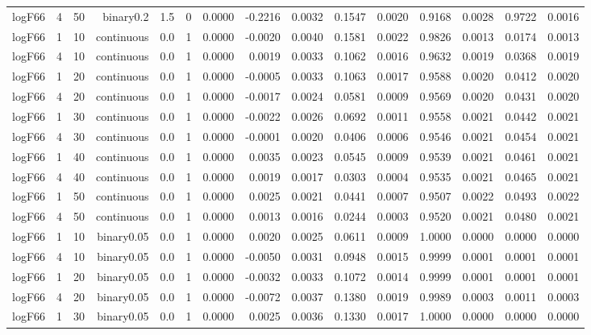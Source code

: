 \begin{longtable}{rrrrrrrrrrrrrrr}
  logF66 & 4 & 50 & binary0.2 & 1.5 & 0 & 0.0000 & -0.2216 & 0.0032 & 0.1547 & 0.0020 & 0.9168 & 0.0028 & 0.9722 & 0.0016 \\ 
  logF66 & 1 & 10 & continuous & 0.0 & 1 & 0.0000 & -0.0020 & 0.0040 & 0.1581 & 0.0022 & 0.9826 & 0.0013 & 0.0174 & 0.0013 \\ 
  logF66 & 4 & 10 & continuous & 0.0 & 1 & 0.0000 & 0.0019 & 0.0033 & 0.1062 & 0.0016 & 0.9632 & 0.0019 & 0.0368 & 0.0019 \\ 
  logF66 & 1 & 20 & continuous & 0.0 & 1 & 0.0000 & -0.0005 & 0.0033 & 0.1063 & 0.0017 & 0.9588 & 0.0020 & 0.0412 & 0.0020 \\ 
  logF66 & 4 & 20 & continuous & 0.0 & 1 & 0.0000 & -0.0017 & 0.0024 & 0.0581 & 0.0009 & 0.9569 & 0.0020 & 0.0431 & 0.0020 \\ 
  logF66 & 1 & 30 & continuous & 0.0 & 1 & 0.0000 & -0.0022 & 0.0026 & 0.0692 & 0.0011 & 0.9558 & 0.0021 & 0.0442 & 0.0021 \\ 
  logF66 & 4 & 30 & continuous & 0.0 & 1 & 0.0000 & -0.0001 & 0.0020 & 0.0406 & 0.0006 & 0.9546 & 0.0021 & 0.0454 & 0.0021 \\ 
  logF66 & 1 & 40 & continuous & 0.0 & 1 & 0.0000 & 0.0035 & 0.0023 & 0.0545 & 0.0009 & 0.9539 & 0.0021 & 0.0461 & 0.0021 \\ 
  logF66 & 4 & 40 & continuous & 0.0 & 1 & 0.0000 & 0.0019 & 0.0017 & 0.0303 & 0.0004 & 0.9535 & 0.0021 & 0.0465 & 0.0021 \\ 
  logF66 & 1 & 50 & continuous & 0.0 & 1 & 0.0000 & 0.0025 & 0.0021 & 0.0441 & 0.0007 & 0.9507 & 0.0022 & 0.0493 & 0.0022 \\ 
  logF66 & 4 & 50 & continuous & 0.0 & 1 & 0.0000 & 0.0013 & 0.0016 & 0.0244 & 0.0003 & 0.9520 & 0.0021 & 0.0480 & 0.0021 \\ 
  logF66 & 1 & 10 & binary0.05 & 0.0 & 1 & 0.0000 & 0.0020 & 0.0025 & 0.0611 & 0.0009 & 1.0000 & 0.0000 & 0.0000 & 0.0000 \\ 
  logF66 & 4 & 10 & binary0.05 & 0.0 & 1 & 0.0000 & -0.0050 & 0.0031 & 0.0948 & 0.0015 & 0.9999 & 0.0001 & 0.0001 & 0.0001 \\ 
  logF66 & 1 & 20 & binary0.05 & 0.0 & 1 & 0.0000 & -0.0032 & 0.0033 & 0.1072 & 0.0014 & 0.9999 & 0.0001 & 0.0001 & 0.0001 \\ 
  logF66 & 4 & 20 & binary0.05 & 0.0 & 1 & 0.0000 & -0.0072 & 0.0037 & 0.1380 & 0.0019 & 0.9989 & 0.0003 & 0.0011 & 0.0003 \\ 
  logF66 & 1 & 30 & binary0.05 & 0.0 & 1 & 0.0000 & 0.0025 & 0.0036 & 0.1330 & 0.0017 & 1.0000 & 0.0000 & 0.0000 & 0.0000 \\ 

\end{longtable}
